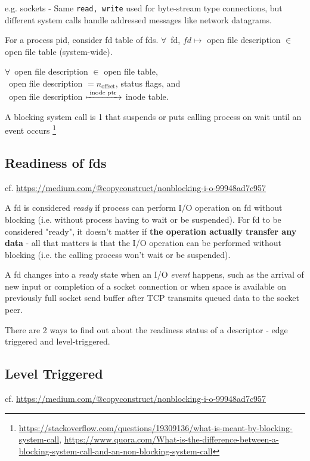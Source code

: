 \documentclass[10pt]{amsart}
\begin{document}
e.g. sockets - Same \texttt{read, write} used for byte-stream type connections, but different system calls handle addressed messages like network datagrams.


For a process pid, consider fd table of fds. $\forall \, $ fd, $fd \mapsto $ open file description $\in$ open file table (system-wide).

$\forall \, $ open file description $\in $ open file table, \\
\qquad \, open file description $= n_{\text{offset}}$, status flags, and \\
\qquad \, open file description $\xmapsto{ \text{ inode ptr } }$ inode table.

A blocking system call is 1 that suspends or puts calling process on wait until an event occurs \footnote{\url{https://stackoverflow.com/questions/19309136/what-is-meant-by-blocking-system-call}, \url{https://www.quora.com/What-is-the-difference-between-a-blocking-system-call-and-an-non-blocking-system-call}}

\subsection{Readiness of fds}

cf. \url{https://medium.com/@copyconstruct/nonblocking-i-o-99948ad7c957}

A fd is considered \emph{ready} if process can perform I/O operation on fd without blocking (i.e. without process having to wait or be suspended). For fd to be considered "ready", it doesn't matter if \textbf{the operation actually transfer any data} - all that matters is that the I/O operation can be performed without blocking (i.e. the calling process won't wait or be suspended).

A fd changes into a \emph{ready} state when an I/O \emph{event} happens, such as the arrival of new input or completion of a socket connection or when space is available on previously full socket send buffer after TCP transmits queued data to the socket peer.

There are 2 ways to find out about the readiness status of a descriptor - edge triggered and level-triggered.

\subsection{Level Triggered}

cf. \url{https://medium.com/@copyconstruct/nonblocking-i-o-99948ad7c957}
\end{document}

